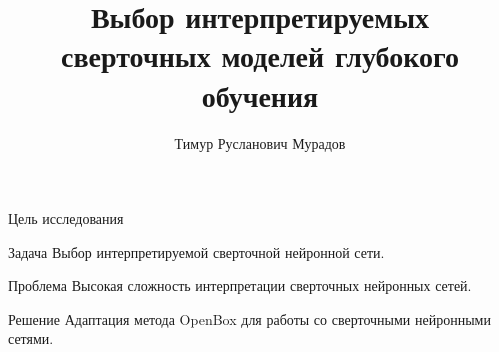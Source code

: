 \documentclass{beamer}
\title[\hbox to 56mm{Интерпретируемые CNN}]{Выбор интерпретируемых \\ сверточных моделей глубокого обучения}
\author[Т.\,Р. Мурадов]{Тимур Русланович Мурадов}
\institute{Московский физико-технический институт}
\date{\footnotesize
\par\smallskip\emph{Курс:} Моя первая научная статья\par (В.\,В.~Стрижов)/Группа Б05-907б
\par\smallskip\emph{Консультанты:} О.~Бахтеев, К.~Яковлев
\par\bigskip\small 2022}
\begin{document}
\begin{frame}
\thispagestyle{empty}
\maketitle
\end{frame}
\begin{frame}{Цель исследования}
	\begin{alertblock}{Задача}
	Выбор интерпретируемой сверточной нейронной сети.
	\end{alertblock}

	\begin{alertblock}{Проблема}
	Высокая сложность интерпретации сверточных нейронных сетей.
	\end{alertblock}

	\begin{alertblock}{Решение}
	Адаптация метода OpenBox для работы со сверточными нейронными сетями.
	\end{alertblock}

\end{frame}
\end{document}
